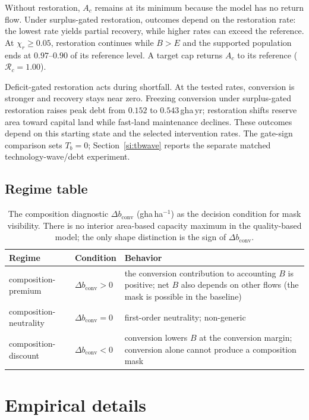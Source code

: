 \documentclass[11pt,a4paper]{article}
\newcommand{\dconv}{\Delta b_{\mathrm{conv}}}
\begin{document}
Without restoration, $A_c$ remains at its minimum because the model has no return flow. Under surplus-gated restoration, outcomes depend on the restoration rate: the lowest rate yields partial recovery, while higher rates can exceed the reference. At $\chi_r\ge0.05$, restoration continues while $B>E$ and the supported population ends at $0.97$--$0.90$ of its reference level. A target cap returns $A_c$ to its reference ($\mathcal R_c=1.00$).

Deficit-gated restoration acts during shortfall. At the tested rates, conversion is stronger and recovery stays near zero. Freezing conversion under surplus-gated restoration raises peak debt from $0.152$ to $0.543$\,gha\,yr; restoration shifts reserve area toward capital land while fast-land maintenance declines. These outcomes depend on this starting state and the selected intervention rates. The gate-sign comparison sets $T_b=0$; Section~\ref{si:tbwave} reports the separate matched technology-wave/debt experiment.

\par\pagebreak

\subsection{Regime table}\label{si:regimes}

\begin{table}[H]
\centering\small
\caption{The composition diagnostic $\dconv$ (gha\,ha$^{-1}$) as the decision condition for mask visibility. There is no interior area-based capacity maximum in the quality-based model; the only shape distinction is the sign of $\dconv$.}
\label{tab:si_regime}
\begin{tabularx}{\textwidth}{l l X}
\toprule
Regime & Condition & Behavior \\
\midrule
composition-premium & $\dconv>0$ & the conversion contribution to accounting $B$ is positive; net $B$ also depends on other flows (the mask is possible in the baseline) \\
composition-neutrality & $\dconv=0$ & first-order neutrality; non-generic \\
composition-discount & $\dconv<0$ & conversion lowers $B$ at the conversion margin; conversion alone cannot produce a composition mask \\
\bottomrule
\end{tabularx}
\end{table}

\section{Empirical details}\label{si:empirical}
\end{document}
